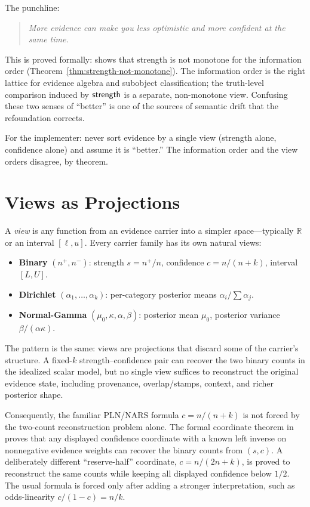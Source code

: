 \documentclass[11pt,openany]{report}
\begin{document}
\noindent
The punchline:
\begin{quote}
\emph{More evidence can make you less optimistic and more confident at
the same time.}
\end{quote}

\noindent
This is proved formally: 
shows that strength is not monotone for the information order
(Theorem~\ref{thm:strength-not-monotone}).  The information order is the
right lattice for evidence algebra and subobject classification; the
truth-level comparison induced by $\mathsf{strength}$ is a separate, non-monotone
view.  Confusing these two senses of ``better'' is one of the sources of
semantic drift that the refoundation corrects.

For the implementer: never sort evidence by a single view (strength alone,
confidence alone) and assume it is ``better.''  The information order and
the view orders disagree, by theorem.

\section{Views as Projections}

A \emph{view} is any function from an evidence carrier into a simpler
space---typically $\mathbb{R}$ or an interval $[\ell, u]$.  Every
carrier family has its own natural views:

\begin{itemize}
\item \textbf{Binary} $(n^+, n^-)$: strength $s = n^+/n$, confidence $c = n/(n+k)$, interval $[L, U]$.
\item \textbf{Dirichlet} $(\alpha_1, \ldots, \alpha_k)$: per-category posterior means $\alpha_i / \sum \alpha_j$.
\item \textbf{Normal-Gamma} $(\mu_0, \kappa, \alpha, \beta)$: posterior mean $\mu_0$, posterior variance $\beta / (\alpha \kappa)$.
\end{itemize}

\noindent
The pattern is the same: views are projections that discard some of the
carrier's structure.  A fixed-$k$ strength--confidence pair can recover
the two binary counts in the idealized scalar model, but no single
view suffices to reconstruct the original evidence state, including
provenance, overlap/stamps, context, and richer posterior shape.

Consequently, the familiar PLN/NARS formula $c=n/(n+k)$ is not forced
by the two-count reconstruction problem alone.  The formal coordinate
theorem in  proves
that any displayed confidence coordinate with a known left inverse on
nonnegative evidence weights can recover the binary counts from
$(s,c)$.  A deliberately different ``reserve-half'' coordinate,
$c=n/(2n+k)$, is proved to reconstruct the same counts while keeping
all displayed confidence below $1/2$.  The usual formula is forced only
after adding a stronger interpretation, such as odds-linearity
$c/(1-c)=n/k$.
\end{document}
